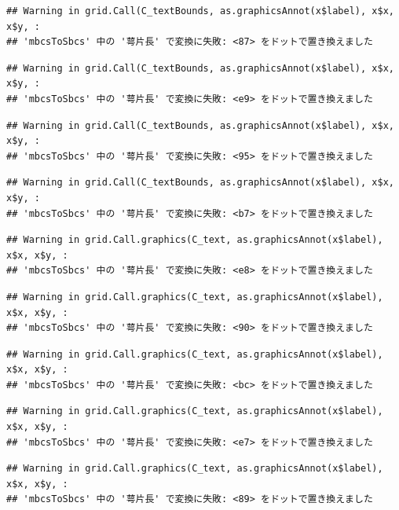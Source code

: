 \documentclass[
]{book}
\begin{document}
\begin{verbatim}
## Warning in grid.Call(C_textBounds, as.graphicsAnnot(x$label), x$x, x$y, :
## 'mbcsToSbcs' 中の '萼片長' で変換に失敗: <87> をドットで置き換えました
\end{verbatim}

\begin{verbatim}
## Warning in grid.Call(C_textBounds, as.graphicsAnnot(x$label), x$x, x$y, :
## 'mbcsToSbcs' 中の '萼片長' で変換に失敗: <e9> をドットで置き換えました
\end{verbatim}

\begin{verbatim}
## Warning in grid.Call(C_textBounds, as.graphicsAnnot(x$label), x$x, x$y, :
## 'mbcsToSbcs' 中の '萼片長' で変換に失敗: <95> をドットで置き換えました
\end{verbatim}

\begin{verbatim}
## Warning in grid.Call(C_textBounds, as.graphicsAnnot(x$label), x$x, x$y, :
## 'mbcsToSbcs' 中の '萼片長' で変換に失敗: <b7> をドットで置き換えました
\end{verbatim}

\begin{verbatim}
## Warning in grid.Call.graphics(C_text, as.graphicsAnnot(x$label), x$x, x$y, :
## 'mbcsToSbcs' 中の '萼片長' で変換に失敗: <e8> をドットで置き換えました
\end{verbatim}

\begin{verbatim}
## Warning in grid.Call.graphics(C_text, as.graphicsAnnot(x$label), x$x, x$y, :
## 'mbcsToSbcs' 中の '萼片長' で変換に失敗: <90> をドットで置き換えました
\end{verbatim}

\begin{verbatim}
## Warning in grid.Call.graphics(C_text, as.graphicsAnnot(x$label), x$x, x$y, :
## 'mbcsToSbcs' 中の '萼片長' で変換に失敗: <bc> をドットで置き換えました
\end{verbatim}

\begin{verbatim}
## Warning in grid.Call.graphics(C_text, as.graphicsAnnot(x$label), x$x, x$y, :
## 'mbcsToSbcs' 中の '萼片長' で変換に失敗: <e7> をドットで置き換えました
\end{verbatim}

\begin{verbatim}
## Warning in grid.Call.graphics(C_text, as.graphicsAnnot(x$label), x$x, x$y, :
## 'mbcsToSbcs' 中の '萼片長' で変換に失敗: <89> をドットで置き換えました
\end{verbatim}
\end{document}
